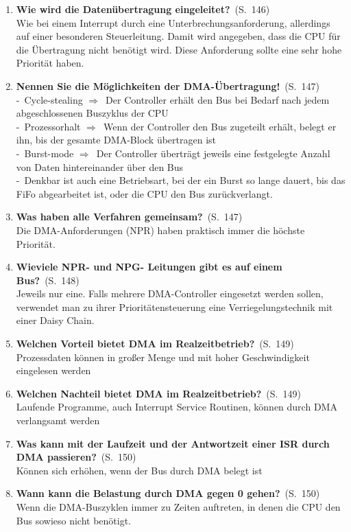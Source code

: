 \documentclass[a4paper,12pt]{article}
\newcommand{\question}[3]{\pagebreak[3]\item {\textbf{#1?}}\ (S.\ #2)#3}
\newcommand{\statement}[3]{\pagebreak[3]\item {\textbf{#1!}}\ (S.\ #2)#3}
\newcommand{\catchword}[1]{\\-\ #1}
\newcommand{\normaltext}[1]{\\#1}
\newcommand{\resultol}[1]{$\Rightarrow$\ #1}
\newcommand{\page}[1]{#1}
\begin{document}
\begin{enumerate}
  \question{Wie wird die Datenübertragung eingeleitet}{\page{146}}
  {
    \normaltext{Wie bei einem Interrupt durch eine Unterbrechungsanforderung, allerdings
                auf einer besonderen Steuerleitung. Damit wird angegeben, dass die CPU
                für die Übertragung nicht benötigt wird. Diese Anforderung sollte eine
                sehr hohe Priorität haben.}
  }

  \statement{Nennen Sie die Möglichkeiten der DMA-Übertragung}{\page{147}}
  {
    \catchword{Cycle-stealing \resultol{Der Controller erhält den Bus bei Bedarf nach jedem abgeschlossenen
               Buszyklus der CPU}}
    \catchword{Prozessorhalt \resultol{Wenn der Controller den Bus zugeteilt erhält, belegt er ihn, bis der
               gesamte DMA-Block übertragen ist}}
    \catchword{Burst-mode \resultol{Der Controller überträgt jeweils eine festgelegte Anzahl von Daten
               hintereinander über den Bus}}
    \catchword{Denkbar ist auch eine Betriebsart, bei der ein Burst so lange dauert, bis das FiFo abgearbeitet
               ist, oder die CPU den Bus zurückverlangt.}
  }

  \question{Was haben alle Verfahren gemeinsam}{\page{147}}
  {
    \normaltext{Die DMA-Anforderungen (NPR) haben praktisch immer die höchste Priorität.}
  }

  \question{Wieviele NPR- und NPG- Leitungen gibt es auf einem Bus}{\page{148}}
  {
    \normaltext{Jeweils nur eine. Falls mehrere DMA-Controller eingesetzt werden sollen, verwendet 
                man zu ihrer Prioritätensteuerung eine Verriegelungstechnik mit einer Daisy Chain.}
  }

  \question{Welchen Vorteil bietet DMA im Realzeitbetrieb}{\page{149}}
  {
    \normaltext{Prozessdaten können in großer Menge und mit hoher Geschwindigkeit eingelesen werden}
  }

  \question{Welchen Nachteil bietet DMA im Realzeitbetrieb}{\page{149}}
  {
    \normaltext{Laufende Programme, auch Interrupt Service Routinen, können durch
                DMA verlangsamt werden}
  }

  \question{Was kann mit der Laufzeit und der Antwortzeit einer ISR durch DMA passieren}{\page{150}}
  {
    \normaltext{Können sich erhöhen, wenn der Bus durch DMA belegt ist}
  }

  \question{Wann kann die Belastung durch DMA gegen 0 gehen}{\page{150}}
  {
    \normaltext{Wenn die DMA-Buszyklen immer zu Zeiten auftreten, in denen die CPU den Bus
                sowieso nicht benötigt.}
  }


\end{enumerate}
\end{document}
